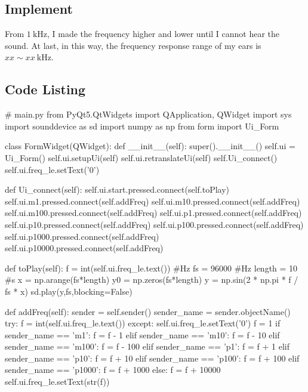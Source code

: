 \documentclass{article}
\begin{document}
\subsection{Implement}
From $1~\mathrm{kHz}$, I made the frequency higher and lower until I cannot hear the sound.
At last, in this way, the frequency response range of my ears is $xx \sim xx ~ \mathrm{kHz}$.





\begin{appendices}
    \section{Code Listing}
    \begin{python}
    # main.py
    from PyQt5.QtWidgets import QApplication, QWidget
    import sys
    import sounddevice as sd
    import numpy as np
    from form import Ui_Form

    class FormWidget(QWidget):
        def __init__(self):
            super().__init__()
            self.ui = Ui_Form()
            self.ui.setupUi(self)
            self.ui.retranslateUi(self)
            self.Ui_connect()
            self.ui.freq_le.setText('0')
        
        def Ui_connect(self):
            self.ui.start.pressed.connect(self.toPlay)
            self.ui.m1.pressed.connect(self.addFreq)
            self.ui.m10.pressed.connect(self.addFreq)
            self.ui.m100.pressed.connect(self.addFreq)
            self.ui.p1.pressed.connect(self.addFreq)
            self.ui.p10.pressed.connect(self.addFreq)
            self.ui.p100.pressed.connect(self.addFreq)
            self.ui.p1000.pressed.connect(self.addFreq)
            self.ui.p10000.pressed.connect(self.addFreq)

        def toPlay(self):
            f = int(self.ui.freq_le.text()) #Hz
            fs = 96000 #Hz
            length = 10 #s
            x = np.arange(fs*length)
            y0 = np.zeros(fs*length)
            y = np.sin(2 * np.pi * f / fs * x)
            sd.play(y,fs,blocking=False)
            
        def addFreq(self):
            sender = self.sender()
            sender_name = sender.objectName()
            try:
                f = int(self.ui.freq_le.text())
            except:
                self.ui.freq_le.setText('0')
                f = 1
            if sender_name == 'm1':
                f = f - 1
            elif sender_name == 'm10':
                f = f - 10
            elif sender_name == 'm100':
                f = f - 100
            elif sender_name == 'p1':
                f = f + 1
            elif sender_name == 'p10':
                f = f + 10
            elif sender_name == 'p100':
                f = f + 100
            elif sender_name == 'p1000':
                f = f + 1000
            else:
                f = f + 10000
            self.ui.freq_le.setText(str(f))
            


\end{python}
\end{appendices}
\end{document}
